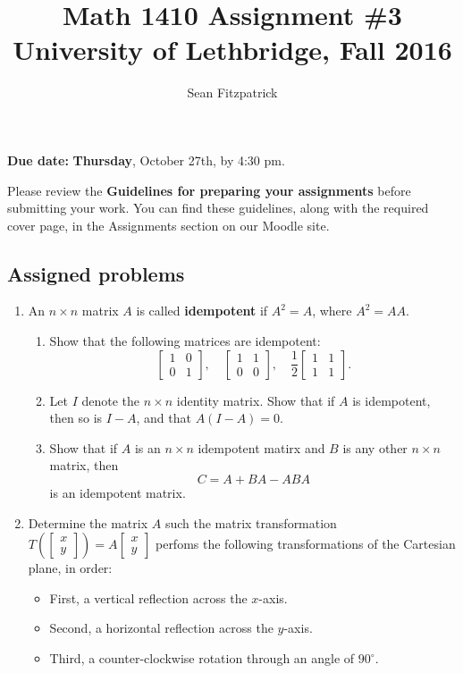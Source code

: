 \documentclass[letterpaper,12pt]{amsart}
\title{Math 1410 Assignment \#3\\University of Lethbridge, Fall 2016}
\author{Sean Fitzpatrick}
\newcommand{\bbm}{\begin{bmatrix}}
\newcommand{\ebm}{\end{bmatrix}}
\begin{document}
 \maketitle

{\bf Due date:} {\bf Thursday}, October 27th, by 4:30 pm.

\bigskip

Please review the {\bf Guidelines for preparing your assignments} before submitting your work. You can find these guidelines, along with the required cover page, in the Assignments section on our Moodle site.



\subsection*{Assigned problems}
\begin{enumerate}
\item An $n\times n$ matrix $A$ is called \textbf{idempotent} if $A^2=A$, where $A^2 = AA$.

\medskip

\begin{enumerate}
 \item Show that the following matrices are idempotent:
\[
 \bbm 1&0\\0&1\ebm,\quad \bbm 1&1\\0&0\ebm,\quad \frac{1}{2}\bbm 1&1\\1&1\ebm.
\]

 \item Let $I$ denote the $n\times n$ identity matrix. Show that if $A$ is idempotent, then so is $I-A$, and that $A(I-A)=0$.

\medskip

 \item Show that if $A$ is an $n\times n$ idempotent matirx and $B$ is any other $n\times n$ matrix, then
\[
 C = A+BA-ABA
\]
 is an idempotent matrix.
 \end{enumerate}

\bigskip

 \item Determine the matrix $A$ such the matrix transformation $T\left(\bbm x\\y\ebm\right) = A\bbm x\\y\ebm$ perfoms the following transformations of the Cartesian plane, in order:
\begin{itemize}
 \item First, a vertical reflection across the $x$-axis.
 \item Second, a horizontal reflection across the $y$-axis.
 \item Third, a counter-clockwise rotation through an angle of $90^\circ$.
\end{itemize}


\end{enumerate}
\end{document}
